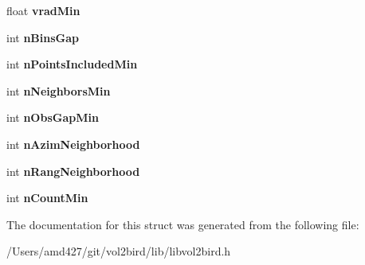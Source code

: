\begin{DoxyCompactItemize}
\item 
\mbox{\label{structvol2birdConstants_a8223d9e6f6e43b25704e92fac5da4475}} 
float {\bfseries vrad\+Min}
\item 
\mbox{\label{structvol2birdConstants_ae8b5593c273c5b96e6ec2277a2de8724}} 
int {\bfseries n\+Bins\+Gap}
\item 
\mbox{\label{structvol2birdConstants_a183c5917ef32e0418ab033c9017f3713}} 
int {\bfseries n\+Points\+Included\+Min}
\item 
\mbox{\label{structvol2birdConstants_a4bb7c75d47301a87788ab593cffb1ece}} 
int {\bfseries n\+Neighbors\+Min}
\item 
\mbox{\label{structvol2birdConstants_a859023778f6d150311806cd33d793b49}} 
int {\bfseries n\+Obs\+Gap\+Min}
\item 
\mbox{\label{structvol2birdConstants_aed735ef3afc8b5d3409c0c8a31747628}} 
int {\bfseries n\+Azim\+Neighborhood}
\item 
\mbox{\label{structvol2birdConstants_a63e719c0152c535e3122109426a30324}} 
int {\bfseries n\+Rang\+Neighborhood}
\item 
\mbox{\label{structvol2birdConstants_a626c23ebe9a0d8a80bc85f41d5ac478a}} 
int {\bfseries n\+Count\+Min}
\end{DoxyCompactItemize}


The documentation for this struct was generated from the following file\+:\begin{DoxyCompactItemize}
\item 
/\+Users/amd427/git/vol2bird/lib/libvol2bird.\+h\end{DoxyCompactItemize}
